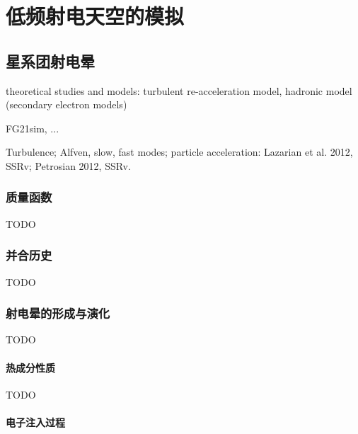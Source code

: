 
\chapter{低频射电天空的模拟}
\label{chap:simulation}

\section{星系团射电晕}
\label{sec:radio-halos}

theoretical studies and models:
turbulent re-acceleration model,
hadronic model (secondary electron models)

FG21sim, ...

Turbulence; Alfven, slow, fast modes; particle acceleration:
Lazarian et al. 2012, SSRv;
Petrosian 2012, SSRv.

\subsection{质量函数}

TODO

\subsection{并合历史}

TODO

\subsection{射电晕的形成与演化}

TODO

\subsubsection{热成分性质}

TODO

\subsubsection{电子注入过程}

